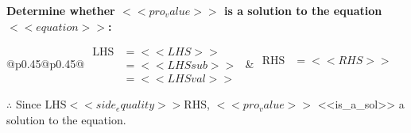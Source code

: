 \noindent \textbf{Determine whether \(<<pro_value>>\) is a solution to the equation \(<<equation>>\):}
\vspace{2pt}  %

\noindent
\renewcommand{\arraystretch}{1.3} %
\begin{tabular}{@{}p{0.45\linewidth}@{}p{0.45\linewidth}@{}}
    \(\begin{aligned}
        \text{LHS} &= <<LHS>> \\
                   &= <<LHSsub>> \\
                   &= <<LHSval>>
    \end{aligned}\) &
    \(\begin{aligned}
        \text{RHS} &= <<RHS>>\\
                   & \\
                   &
    \end{aligned}\)
\end{tabular}
\renewcommand{\arraystretch}{1.0} %
\vspace{2pt}  %

\noindent \(\therefore\) Since \(\text{LHS} <<side_equality>> \text{RHS}\), \(<<pro_value>>\) <<is_a_sol>> a solution to the equation.